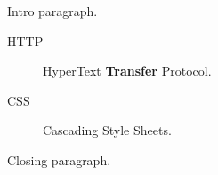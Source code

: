 Intro paragraph.

\begin{description}
\item[HTTP] HyperText \textbf{Transfer} Protocol.
\item[CSS] Cascading Style Sheets.
\end{description}

Closing paragraph.

